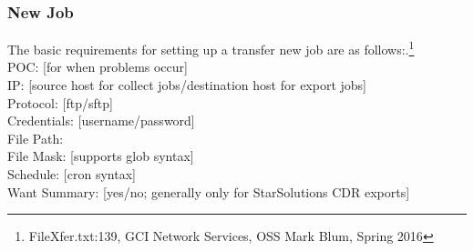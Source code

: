 
\subsubsection{New Job}
\noindent The basic requirements for setting up a transfer new job
are as follows:.\footnote{FileXfer.txt:139, GCI Network Services,
OSS Mark Blum, Spring 2016}\\
POC: [for when problems occur]\\
IP: [source host for collect jobs/destination host for export jobs]\\
Protocol: [ftp/sftp]\\
Credentials: [username/password]\\
File Path:\\
File Mask: [supports glob syntax]\\
Schedule: [cron syntax]\\
Want Summary: [yes/no; generally only for StarSolutions CDR exports]
